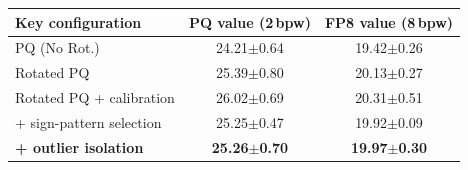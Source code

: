 \begin{tabular}{lcc}
\toprule
\textbf{Key configuration} & \textbf{PQ value (2\,bpw)} & \textbf{FP8 value (8\,bpw)} \\
\midrule
PQ (No Rot.) & 24.21$\pm$0.64 & 19.42$\pm$0.26 \\
Rotated PQ & 25.39$\pm$0.80 & 20.13$\pm$0.27 \\
Rotated PQ + calibration & 26.02$\pm$0.69 & 20.31$\pm$0.51 \\
\quad + sign-pattern selection & 25.25$\pm$0.47 & 19.92$\pm$0.09 \\
\textbf{\quad + outlier isolation} & \textbf{25.26$\pm$0.70} & \textbf{19.97$\pm$0.30} \\
\bottomrule
\end{tabular}
